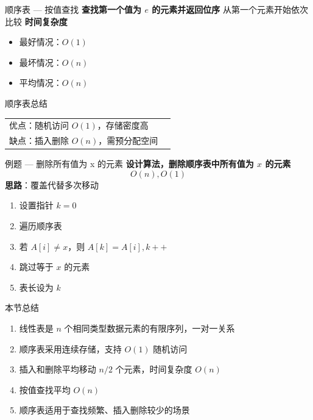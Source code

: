 \documentclass[10pt, aspectratio=169]{beamer}
\begin{document}
\begin{frame}{顺序表 --- 按值查找}
    \textbf{查找第一个值为 $e$ 的元素并返回位序}
    \vspace{0.3em}
    从第一个元素开始依次比较
    \vspace{0.5em}
    \textbf{时间复杂度}
    \begin{itemize}
        \item 最好情况：$O(1)$
        \item 最坏情况：$O(n)$
        \item 平均情况：$O(n)$
    \end{itemize}
    \vspace{0.5em}
    \begin{block}{顺序表总结}
        \begin{tabular}{ll}
            优点：随机访问 $O(1)$，存储密度高 \\
            缺点：插入删除 $O(n)$，需预分配空间
        \end{tabular}
    \end{block}
\end{frame}

\begin{frame}{例题 --- 删除所有值为 x 的元素}
    \textbf{设计算法，删除顺序表中所有值为 $x$ 的元素}
    \[
    O(n), O(1)
    \]
    \vspace{0.3em}
    \textbf{思路}：覆盖代替多次移动
    \vspace{0.3em}
    \begin{enumerate}
        \item 设置指针 $k = 0$
        \item 遍历顺序表
        \item 若 $A[i] \ne x$，则 $A[k] = A[i], k++$
        \item 跳过等于 $x$ 的元素
        \item 表长设为 $k$
    \end{enumerate}
\end{frame}

\begin{frame}{本节总结}
    \begin{enumerate}
        \item 线性表是 $n$ 个相同类型数据元素的有限序列，一对一关系
        \item 顺序表采用连续存储，支持 $O(1)$ 随机访问
        \item 插入和删除平均移动 $n/2$ 个元素，时间复杂度 $O(n)$
        \item 按值查找平均 $O(n)$
        \item 顺序表适用于查找频繁、插入删除较少的场景
    \end{enumerate}
\end{frame}
\end{document}

